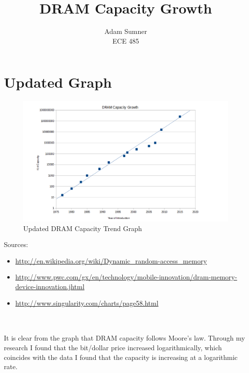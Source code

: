 \documentclass[]{article}
\title{\textbf{DRAM Capacity Growth}}
\author{Adam Sumner \\ ECE 485}
\date{}
\begin{document}
\maketitle

\section{Updated Graph}

\begin{figure}[h!]
\centering
\includegraphics[width=1\linewidth]{graph}
\caption{Updated DRAM Capacity Trend Graph}
\label{fig:graph}
\end{figure}

Sources: 
\begin{itemize}
	\item \url{http://en.wikipedia.org/wiki/Dynamic_random-access_memory}
	\item \url{http://www.pwc.com/gx/en/technology/mobile-innovation/dram-memory-device-innovation.jhtml}
	\item \url{http://www.singularity.com/charts/page58.html}
\end{itemize}
~\\
~\\
It is clear from the graph that DRAM capacity follows Moore's law. Through my research I found that the bit/dollar price increased logarithmically, which coincides with the data I found that the capacity is increasing at a logarithmic rate. 
\end{document}
